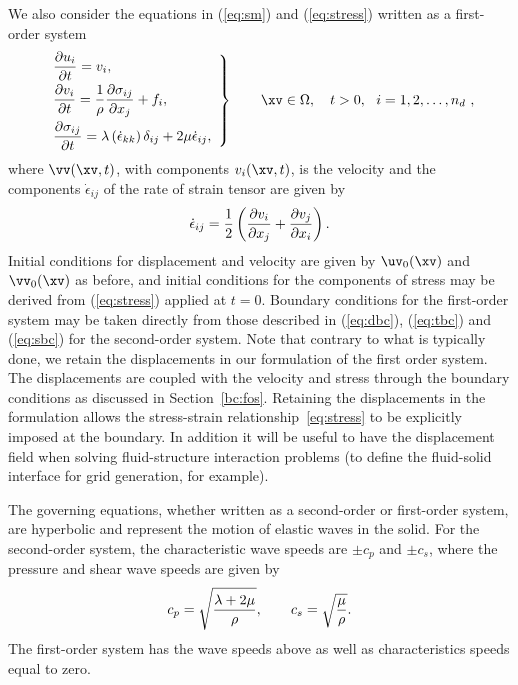\documentclass[11pt]{article}
\begin{document}
We also consider the equations in (\ref{eq:sm}) and (\ref{eq:stress}) written as a first-order system
\begin{equation}
\left.
\begin{array}{l}
\displaystyle{
{\partial u_i\over\partial t}=v_i,
}\smallskip\\
\displaystyle{
{\partial v_i\over\partial t}={1\over\rho}{\partial\s_{ij}\over\partial x_j}+f_i,
}\smallskip\\
\displaystyle{
{\partial\s_{ij}\over\partial t}=\lambda\left(\dot\epsilon_{kk}\right)\delta_{ij}+2\mu\dot\epsilon_{ij},
}
\end{array}
\right\}\qquad \xv\in\Omega,\quad t>0,~~ i=1,2,\ldots,\nd ~,
\label{eq:smFOS}
\end{equation}
where $\vv(\xv,t)$, with components $v_i(\xv,t)$, is the velocity and the components $\dot\epsilon_{ij}$ of the rate of strain tensor are given by
\[
\dot\epsilon_{ij}={1\over2}\left({\partial v_i\over\partial x_j}+{\partial v_j\over\partial x_i}\right).
\]
%
Initial conditions for displacement and velocity are given by $\uv_0(\xv)$ and $\vv_0(\xv)$ as before, and initial conditions for the components of stress may be derived from (\ref{eq:stress}) applied at $t=0$.  Boundary conditions for the first-order system may be taken directly from those described in (\ref{eq:dbc}), (\ref{eq:tbc}) and (\ref{eq:sbc}) for the second-order system.
Note that contrary to what is typically done, we retain the displacements in our formulation of the first order system. 
The displacements are coupled with the velocity and stress through the boundary conditions as discussed in Section~\ref{bc:fos}.
% 
Retaining the displacements in the formulation allows the stress-strain relationship~\eqref{eq:stress} to be explicitly imposed
at the boundary. In addition it will be useful to have the displacement field when solving fluid-structure interaction problems (to define the 
fluid-solid interface for grid generation, for example).

The governing equations, whether written as a second-order or first-order system, are
hyperbolic and represent the motion of elastic waves in the solid. For the second-order system, the characteristic 
wave speeds
are $\pm c_p$ and $\pm c_s$, where the pressure and shear wave speeds are given by
\begin{equation}
c_p=\sqrt{\lambda+2\mu\over\rho},\qquad c_s=\sqrt{\mu\over\rho}.
\label{eq:pswaves}
\end{equation}
The first-order system has the wave speeds above as well as characteristics speeds equal to zero.  
\end{document}

